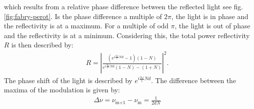 which results from a relative phase difference between the reflected light see fig.\,\ref{fig:fabry-perot}.
Is the phase difference a multiple of $2\pi$, the light is in phase and the reflectivity is at a maximum.
For a multiple of odd $\pi$, the light is out of phase and the reflectivity is at a minimum.
Considering this, the total power reflectivity $R$ is then described by:
\begin{align}
    R = \left\lvert \frac{(e^{i\frac{2\omega}{c}Nd}-1)(1-N)}{e^{i\frac{2\omega}{c}Nd}(1-N)-(1+N)} \right\rvert^2. \label{eq:R}
\end{align}
The phase shift of the light is described by $e^{i\frac{2\omega}{c}Nd}$. 
The difference between the maxima of the modulation is given by:
\begin{align}
    \Delta \nu = \nu_{\text{m+1}}-\nu_{\text{m}} = \frac{1}{2dN} \label{eq:delta_nu}
\end{align}



